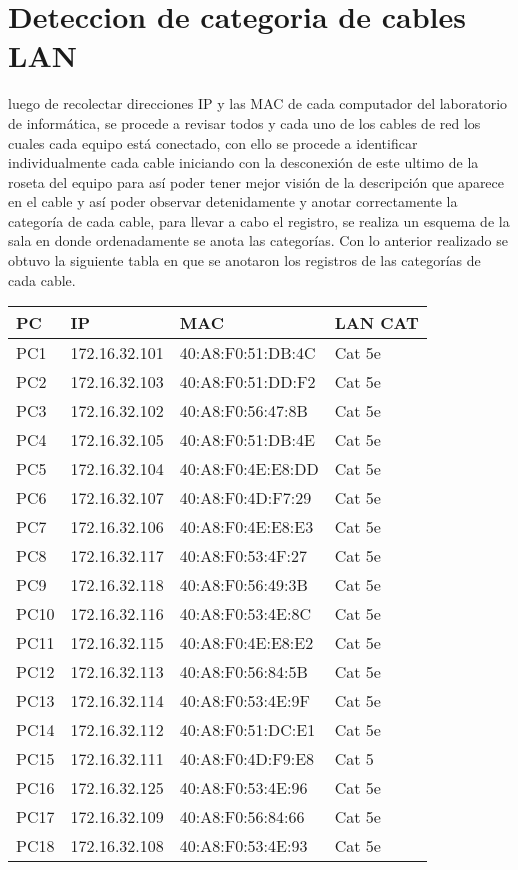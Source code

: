 \documentclass[spanish]{udpreport}
\begin{document}
\section{Deteccion de categoria de cables LAN}

luego de recolectar direcciones IP y las MAC de cada computador del laboratorio de informática, se procede a revisar todos y cada uno de los cables de red los cuales cada equipo está conectado, con ello se procede a identificar individualmente cada cable iniciando con la desconexión de este ultimo de la roseta del equipo para así poder tener mejor visión de la descripción que aparece en el cable y así poder observar detenidamente y anotar correctamente la categoría de cada cable, para llevar a cabo el registro, se realiza un esquema de la sala en donde ordenadamente se anota las categorías. Con lo anterior realizado se obtuvo la siguiente tabla en que se anotaron los registros de las categorías de cada cable.

\vspace{2cm}

\begin{table}[H]
\begin{center}
\begin{tabular}{|l|l|l|l|}
\hline
PC & IP & MAC & LAN CAT \\
\hline \hline
PC1 & 172.16.32.101  & 40:A8:F0:51:DB:4C & Cat 5e\\ \hline
PC2 & 172.16.32.103  & 40:A8:F0:51:DD:F2 & Cat 5e\\ \hline
PC3 & 172.16.32.102  & 40:A8:F0:56:47:8B & Cat 5e\\ \hline
PC4 & 172.16.32.105  & 40:A8:F0:51:DB:4E & Cat 5e\\ \hline
PC5 & 172.16.32.104  & 40:A8:F0:4E:E8:DD & Cat 5e\\ \hline
PC6 & 172.16.32.107  & 40:A8:F0:4D:F7:29 & Cat 5e\\ \hline
PC7 & 172.16.32.106  & 40:A8:F0:4E:E8:E3 & Cat 5e\\ \hline
PC8 & 172.16.32.117  & 40:A8:F0:53:4F:27 & Cat 5e\\ \hline
PC9 & 172.16.32.118  & 40:A8:F0:56:49:3B & Cat 5e\\ \hline
PC10 & 172.16.32.116 & 40:A8:F0:53:4E:8C & Cat 5e\\ \hline
PC11 & 172.16.32.115 & 40:A8:F0:4E:E8:E2 & Cat 5e\\ \hline
PC12 & 172.16.32.113 & 40:A8:F0:56:84:5B & Cat 5e\\ \hline
PC13 & 172.16.32.114 & 40:A8:F0:53:4E:9F & Cat 5e\\ \hline
PC14 & 172.16.32.112 & 40:A8:F0:51:DC:E1 & Cat 5e\\ \hline
PC15 & 172.16.32.111 & 40:A8:F0:4D:F9:E8 & Cat 5\\ \hline
PC16 & 172.16.32.125 & 40:A8:F0:53:4E:96 & Cat 5e\\ \hline
PC17 & 172.16.32.109 & 40:A8:F0:56:84:66 & Cat 5e\\ \hline
PC18 & 172.16.32.108 & 40:A8:F0:53:4E:93 & Cat 5e\\ \hline
\end{tabular}
\label{tabla:sencilla}
\end{center}
\end{table}
\end{document}
